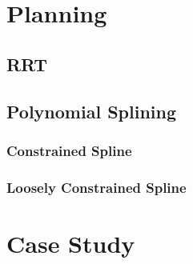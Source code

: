 \documentclass[oneside, 11pt]{book}
\begin{document}
\chapter{Planning}\label{sec:planning}

\section{RRT}

\section{Polynomial Splining}

\subsection{Constrained Spline}

\subsection{Loosely Constrained Spline}\label{sec:restrictpolyfit}

\chapter{Case Study}
\end{document}
